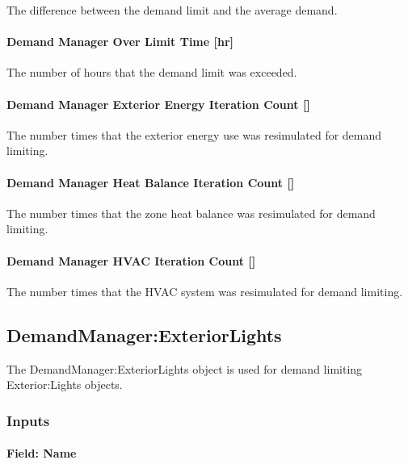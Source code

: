 The difference between the demand limit and the average demand.

\paragraph{Demand Manager Over Limit Time {[}hr{]}}\label{demand-manager-over-limit-time-hr}

The number of hours that the demand limit was exceeded.

\paragraph{Demand Manager Exterior Energy Iteration Count {[]}}\label{demand-manager-exterior-energy-iteration-count}

The number times that the exterior energy use was resimulated for demand limiting.

\paragraph{Demand Manager Heat Balance Iteration Count {[]}}\label{demand-manager-heat-balance-iteration-count}

The number times that the zone heat balance was resimulated for demand limiting.

\paragraph{Demand Manager HVAC Iteration Count {[]}}\label{demand-manager-hvac-iteration-count}

The number times that the HVAC system was resimulated for demand limiting.

\subsection{DemandManager:ExteriorLights}\label{demandmanagerexteriorlights}

The DemandManager:ExteriorLights object is used for demand limiting Exterior:Lights objects.

\subsubsection{Inputs}\label{inputs-1-009}

\paragraph{Field: Name}\label{field-name-1-008}

